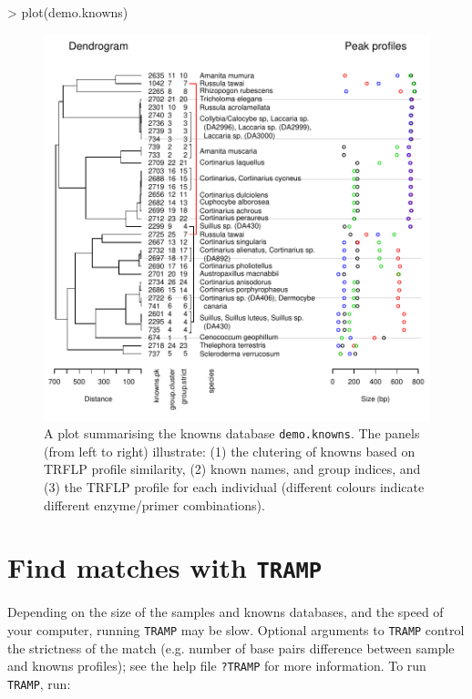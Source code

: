 \documentclass[a4paper]{article}
\newcommand\code\texttt
\newcommand{\help}[1]{\texttt{?#1}}
\begin{document}
\begin{Schunk}
\begin{Sinput}
> plot(demo.knowns)
\end{Sinput}
\end{Schunk}

\begin{figure}
  \centering
\includegraphics{TRAMPRdemo-012}
\caption{A plot summarising the knowns database \code{demo.knowns}.
  The panels (from left to right) illustrate: (1) the clutering of
  knowns based on TRFLP profile similarity, (2) known names, and group
  indices, and (3) the TRFLP profile for each individual (different
  colours indicate different enzyme/primer combinations).}
\label{fig:knowns}
\end{figure}

\section{Find matches with \code{TRAMP}}

Depending on the size of the samples and knowns databases, and the
speed of your computer, running \code{TRAMP} may be slow.  Optional
arguments to \code{TRAMP} control the strictness of the match
(e.g. number of base pairs difference between sample and knowns
profiles); see the help file \help{TRAMP} for more information.  To
run \code{TRAMP}, run:
\end{document}

